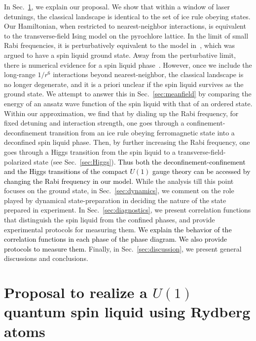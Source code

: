 \documentclass[twocolumn,superscriptaddress,amsmath,amssymb,aps,prx,nofootinbib]{revtex4-2}
\newcommand{\newtext}[1]{\textcolor{black}{#1}}
\begin{document}
In Sec.~\ref{sec:proposal}, we explain our proposal. We show that within a window of laser detunings, the classical landscape is identical to the set of ice rule obeying states. Our Hamiltonian, when restricted to nearest-neighbor interactions, is equivalent to the transverse-field Ising model on the pyrochlore lattice. In the limit of small Rabi frequencies, it is perturbatively equivalent to the model in~\cite{hermele2004}, which was argued to have a spin liquid ground state. Away from the perturbative limit, there is numerical evidence for a spin liquid phase~\cite{emonts2018monte}. However, once we include the long-range $1/r^6$ interactions beyond nearest-neighbor, the classical landscape is no longer degenerate, and it is a priori unclear if the spin liquid survives as the ground state. We attempt to answer this in Sec.~\ref{sec:meanfield} by comparing the energy of an ansatz wave function of the spin liquid with that of an ordered state. 
Within our approximation, we find that by dialing up the Rabi frequency, for fixed detuning and interaction strength, one goes through a confinement-deconfinement transition from an ice rule obeying ferromagnetic state into a deconfined spin liquid phase. Then, by further increasing the Rabi frequency, one goes through a Higgs transition from the spin liquid to a transverse-field-polarized state (see Sec.~\ref{sec:Higgs}). 
\newtext{Thus both the deconfinement-confinement and the Higgs transitions of the compact $U(1)$ gauge theory can be accessed by changing the Rabi frequency in our model.}
While the analysis till this point focuses on the ground state, in Sec.~\ref{sec:dynamics}, we comment on the role played by dynamical state-preparation in deciding the nature of the state prepared in experiment. 
In Sec.~\ref{sec:diagnostics}, we present correlation functions that distinguish the spin liquid from the confined phases, and provide experimental protocols for measuring them.
\newtext{We explain the behavior of the correlation functions in each phase of the phase diagram. We also provide protocols to measure them.}
Finally, in Sec.~\ref{sec:discussion}, we present general discussions and conclusions.


\section{Proposal to realize a $U(1)$ quantum spin liquid using Rydberg atoms}\label{sec:proposal}
\end{document}
